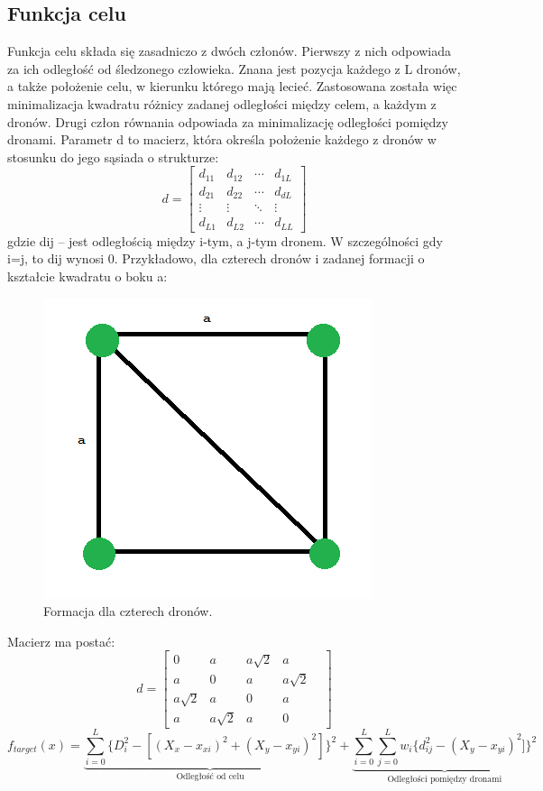 \documentclass[a4paper, 11pt, oneside]{article}
\begin{document}
\subsection{Funkcja celu}
Funkcja celu składa się zasadniczo z dwóch członów. Pierwszy z nich odpowiada za ich odległość od śledzonego człowieka. Znana jest pozycja każdego z L dronów, a także położenie celu, w kierunku którego mają lecieć. Zastosowana została więc minimalizacja kwadratu różnicy zadanej odległości między celem, a każdym z dronów.
Drugi człon równania odpowiada za minimalizację odległości pomiędzy dronami. Parametr d to macierz, która określa położenie każdego z dronów w stosunku do jego sąsiada o strukturze:
$$
d=
\begin{bmatrix}
d_{11} &
d_{12} &
\cdots &
d_{1L}\\
d_{21} &
d_{22} &
\cdots &
d_{dL}\\
\vdots &
\vdots &
\ddots & \vdots
\\
d_{L1} &
d_{L2} &
\cdots &
d_{LL}
\end{bmatrix}
$$
gdzie dij – jest odległością między i-tym, a j-tym dronem. W szczególności gdy i=j, to dij wynosi 0.
\newline
\newline
Przykładowo, dla czterech dronów i zadanej formacji o kształcie kwadratu o boku a:
\begin{figure}[H]
\centering
\includegraphics[scale=0.5]{blok_axa.png}
\caption{Formacja dla czterech dronów.}
\end{figure}

Macierz ma postać:
$$
d=
\begin{bmatrix}
0 &
a &
a\sqrt{2} &
a\\
a &
0 &
a &
a\sqrt{2}\\
a\sqrt{2} &
a &
0 & 
a &\\
a &
a\sqrt{2} &
a &
0
\end{bmatrix}
$$
\begin{equation}
f_{target}(x)= \underbrace{\sum_{i=0}^{L}\lbrace D_i^2 - [(X_x -x_{xi})^2+(X_y -x_{yi})^2] \rbrace ^2}_\text{Odległość od celu} +
\underbrace{\sum_{i=0}^{L}\sum_{j=0}^{L}w_i\lbrace d_{ij}^2 -(X_y -x_{yi})^2]\rbrace ^2}_\text{Odległości pomiędzy dronami}
\end{equation}
\end{document}
